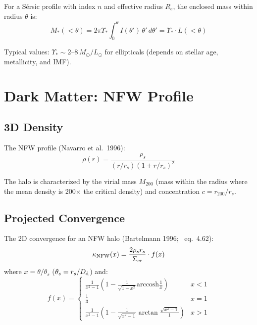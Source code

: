 \documentclass[11pt, letterpaper]{article}
\begin{document}
For a S\'ersic profile with index $n$ and effective radius $R_e$, the
enclosed mass within radius $\theta$ is:
\begin{equation}
M_*(<\theta) = 2\pi \Upsilon_* \int_0^\theta I(\theta')\,\theta'\,d\theta'
= \Upsilon_* \cdot L(<\theta)
\end{equation}

Typical values: $\Upsilon_* \sim 2$--$8\,M_\odot/L_\odot$ for ellipticals
(depends on stellar age, metallicity, and IMF).

\section{Dark Matter: NFW Profile}
\label{sec:nfw}

\subsection{3D Density}

The NFW profile (Navarro et al.\ 1996):
\begin{equation}
\rho(r) = \frac{\rho_s}{(r/r_s)(1+r/r_s)^2}
\label{eq:nfw-3d}
\end{equation}

The halo is characterized by the virial mass $M_{200}$ (mass within the
radius where the mean density is 200$\times$ the critical density) and
concentration $c = r_{200}/r_s$.

\subsection{Projected Convergence}

The 2D convergence for an NFW halo (Bartelmann 1996; \CK\ eq.~4.62):
\begin{equation}
\kappa_{\rm NFW}(x) = \frac{2\rho_s r_s}{\Sigma_{\rm cr}} \cdot f(x)
\label{eq:nfw-kappa}
\end{equation}
where $x = \theta/\theta_s$ ($\theta_s = r_s/D_{\rm d}$) and:
\begin{equation}
f(x) = \begin{cases}
\frac{1}{x^2-1}\left(1 - \frac{1}{\sqrt{1-x^2}}\text{arccosh}\frac{1}{x}\right)
& x < 1 \\[6pt]
\frac{1}{3} & x = 1 \\[6pt]
\frac{1}{x^2-1}\left(1 - \frac{1}{\sqrt{x^2-1}}\arctan\frac{\sqrt{x^2-1}}{1}\right)
& x > 1
\end{cases}
\end{equation}
\end{document}
